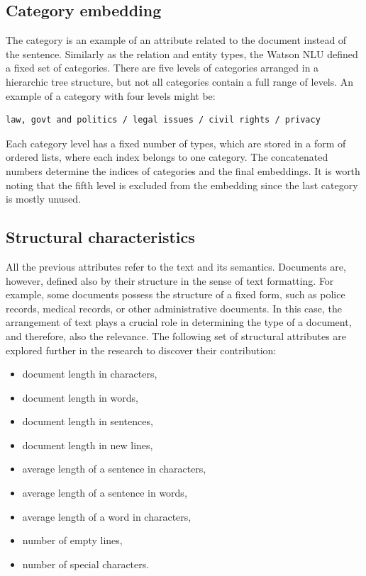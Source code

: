 \documentclass[
  digital, %
  notable,   %
  nolof,     %
  nolot,     %
]{fithesis3}
\begin{document}
\subsection{Category embedding}
The category is an example of an attribute related to the document instead of the sentence.
Similarly as the relation and entity types, the Watson NLU defined a fixed set of categories.
There are five levels of categories arranged in a hierarchic tree structure, but not all categories contain a full range of levels.
An example of a category with four levels might be:
\begin{verbatim}
law, govt and politics / legal issues / civil rights / privacy
\end{verbatim}

Each category level has a fixed number of types, which are stored in a form of ordered lists, where each index belongs to one category.
The concatenated numbers determine the indices of categories and the final embeddings.
It is worth noting that the fifth level is excluded from the embedding since the last category is mostly unused.

\subsection{Structural characteristics}
\label{sec:structural_characteristics}
All the previous attributes refer to the text and its semantics.
Documents are, however, defined also by their structure in the sense of text formatting.
For example, some documents possess the structure of a fixed form, such as police records, medical records, or other administrative documents.
In this case, the arrangement of text plays a crucial role in determining the type of a document, and therefore, also the relevance.
The following set of structural attributes are explored further in the research to discover their contribution:
\begin{itemize}
\item document length in characters,
\item document length in words,
\item document length in sentences,
\item document length in new lines,
\item average length of a sentence in characters,
\item average length of a sentence in words,
\item average length of a word in characters,
\item number of empty lines,
\item number of special characters.
\end{itemize}
\end{document}
